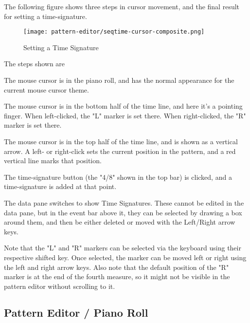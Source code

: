    The following figure shows three steps in cursor movement, and the final
   result for setting a time-signature.

\begin{figure}[H]
   \centering 
   \texttt{[image: pattern-editor/seqtime-cursor-composite.png]}
   \caption{Setting a Time Signature}
   \label{fig:pattern_editor_seqtime_cursor_composite}
\end{figure}

   The steps shown are

   \begin{enumber}
      \item The mouse cursor is in the piano roll, and has the normal
         appearance for the current mouse cursor theme.
      \item The mouse cursor is in the bottom half of the time line, and
         here it's a pointing finger.
         When left-clicked, the "L" marker is set there.
         When right-clicked, the "R" marker is set there.
      \item The mouse cursor is in the top half of the time line, and is
         shown as a vertical arrow.
         A left- or right-click sets the current position in the
         pattern, and a red vertical line marks that position.
      \item The time-signature button (the "4/8" shown in the top
         bar) is clicked, and a time-signature is added at that point.
      \item The data pane switches to show Time Signatures.
         These cannot be edited in the data pane, but in the event bar above
         it, they can be selected by drawing a box around them, and then
         be either deleted or moved with the Left/Right arrow keys.
   \end{enumber}

   Note that the "L" and "R" markers can be selected via the keyboard using
   their respective shifted key.  Once selected, the marker can be moved left
   or right using the left and right arrow keys.
   Also note that the default position of the "R" marker is at the end of the
   fourth measure, so it might not be visible in the pattern editor without
   scrolling to it.

\subsection{Pattern Editor / Piano Roll}
\label{subsec:pattern_editor_piano_roll}


